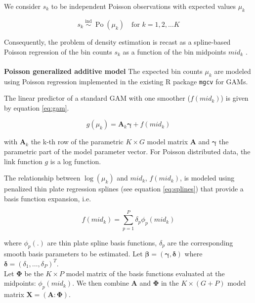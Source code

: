We consider $s_k$ to be independent Poisson observations with expected values $\mu_k$

\begin{equation}
    s_k \stackrel{\text { ind }}{\sim}
    \operatorname{Po}\left(\mu_k\right) \quad
    \text{for } k=1,2, \ldots K
    \label{eq:poisson}
\end{equation}

Consequently, the problem of density estimation is recast as a spline-based Poisson regression of the bin counts $s_k$ as a function of the bin midpoints $mid_k$ \cite{efron}.
\\
\\
\textbf{Poisson generalized additive model}
The expected bin counts $\mu_k$ are modeled using Poisson regression implemented in the existing R package \texttt{mgcv} \cite{mgcv} for GAMs.

The linear predictor of a standard GAM with one smoother ($f(mid_k)$) is given by equation \ref{eq:gam}.

\begin{equation}
    g(\mu_k) = \boldsymbol{A}_k\boldsymbol{\gamma} + f(mid_k)
    \label{eq:gam}
\end{equation}

with $\boldsymbol{A}_k$ the k-th row of the parametric $K \times G$ model matrix $\boldsymbol{A}$ and $\boldsymbol{\gamma}$ the parametric part of the model parameter vector. For Poisson distributed data, the link function $g$ is a log function.

The relationship between $\log(\mu_k)$ and $mid_k$, $f(mid_k)$, is modeled using penalized thin plate regression splines (see equation \ref{eq:splines}) that provide a basis function expansion, i.e.

\begin{equation}
    f(mid_k) = \sum_{p=1}^{P}\delta_p\phi_p(mid_k)
    \label{eq:splines}
\end{equation}

where $\phi_p(.)$ are thin plate spline basis functions, $\delta_p$ are the corresponding smooth basis parameters to be estimated. Let $\boldsymbol{{\beta}} = (\boldsymbol{\gamma},\boldsymbol{\delta})$ where $\boldsymbol{\delta} = (\delta_1,\dots, \delta_P)^T$.\\
Let $\boldsymbol{\Phi}$ be the $K \times P$ model matrix of the basis functions evaluated at the midpoints: $\phi_p(mid_k)$.
We then combine $\boldsymbol{A}$ and $\boldsymbol{\Phi}$ in the $K \times (G+P)$ model matrix $\boldsymbol{X} = (\boldsymbol{A} : \boldsymbol{\Phi})$.

